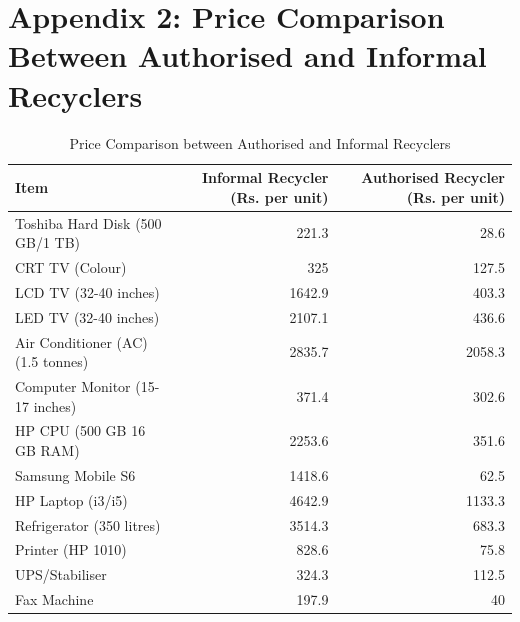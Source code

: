 \documentclass[a4paper, 12pt]{article}
\begin{document}
        \section*{Appendix 2: Price Comparison Between Authorised and Informal Recyclers}
                    \begin{table}[htbp]
                      \centering
                      \caption{Price Comparison between Authorised and Informal Recyclers}
                        \begin{tabular}{lrr}
                        Item  & \multicolumn{1}{p{8em}}{Informal Recycler \newline{}(Rs. per unit)} & \multicolumn{1}{p{8em}}{Authorised Recycler \newline{}(Rs. per unit)} \\
                        \midrule
                        Toshiba Hard Disk (500 GB/1 TB) & 221.3 & 28.6 \\
                        CRT TV (Colour) & 325   & 127.5 \\
                        LCD TV (32-40 inches) & 1642.9 & 403.3 \\
                        LED TV (32-40 inches) & 2107.1 & 436.6 \\
                        Air Conditioner (AC) (1.5 tonnes) & 2835.7 & 2058.3 \\
                        Computer Monitor (15-17 inches) & 371.4 & 302.6 \\
                        HP CPU (500 GB 16 GB RAM) & 2253.6 & 351.6 \\
                        Samsung Mobile S6 & 1418.6 & 62.5 \\
                        HP Laptop (i3/i5) & 4642.9 & 1133.3 \\
                        Refrigerator (350 litres) & 3514.3 & 683.3 \\
                        Printer (HP 1010) & 828.6 & 75.8 \\
                        UPS/Stabiliser  & 324.3 & 112.5 \\
                        Fax Machine  & 197.9 & 40 \\
                        \end{tabular}%
                      \label{tab:addlabel}%
                    \end{table}%
                         
\end{document}
